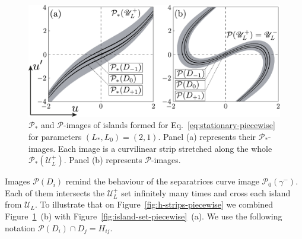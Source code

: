 \begin{figure}[h]
\centering
	\includegraphics[scale = 1]{pic/Poincare map of islands for piecewise equation}
	\caption{
		$\mathcal{P}_*$ and $\mathcal{P}$-images of islands formed for Eq.~\eqref{eq:stationary-piecewise} for parameters $(L_*, L_0) = (2, 1)$.
		Panel (a) represents their $\mathcal{P}_*$-images.
		Each image is a curvilinear strip stretched along the whole $\mathcal{P}_*(\mathscr{U}_L^+)$.
		Panel (b) represents $\mathcal{P}$-images.
	}
\label{fig:map-of-islands-piecewise}
\end{figure}

Images $\mathcal{P}(D_i)$ remind the behaviour of the separatrices curve image $\mathcal{P}_0(\gamma^-)$.
Each of them intersects the $\mathscr{U}_L^+$ set infinitely many times and cross each island from $\mathscr{U}_L$.
To illustrate that on Figure~\ref{fig:h-strips-piecewise} we combined Figure~\ref{fig:map-of-islands-piecewise}~(b) with Figure~\ref{fig:island-set-piecewise}~(a).
We use the following notation $\mathcal{P}(D_i) \cap D_j = H_{ij}$.

